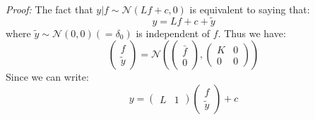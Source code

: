\documentclass{article}
\theoremstyle{definition}
\theoremstyle{remark}
\theoremstyle{remark}
\begin{document}
\noindent\textit{Proof:} The fact that $y|f\sim\mathcal{N}(Lf+c,0)$ is equivalent to saying that:
\begin{equation*}
    y=Lf+c+\tilde{y}
\end{equation*}
where $\tilde{y}\sim\mathcal{N}(0,0)(=\delta_{0})$ is independent of $f$. Thus we have:
\begin{equation*}
    \begin{pmatrix}
        f \\
        \tilde{y}
    \end{pmatrix}=\mathcal{N}\left(\begin{pmatrix}
                                \bar{f} \\
                                0
                            \end{pmatrix},\begin{pmatrix}
                                            K & 0 \\
                                            0 & 0
                                          \end{pmatrix}\right)
\end{equation*}
Since we can write:
\begin{equation*}
    y=\begin{pmatrix}
        L & 1
    \end{pmatrix}\begin{pmatrix}
                    f \\
                    \tilde{y}
                 \end{pmatrix}+c
\end{equation*}
\end{document}
